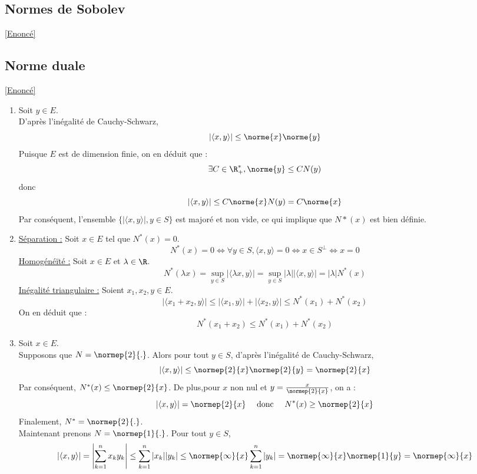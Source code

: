 \documentclass{book}
\begin{document}
	\subsection{Normes de Sobolev}\label{sec:normes-de-sobolev}
		\textcolor{blue}{\hyperref[Normes de Sobolev]{[Enoncé]}}\\
		
	\subsection{Norme duale}\label{sec:norme-duale}
		\textcolor{blue}{\hyperref[Norme duale]{[Enoncé]}}\\
		\begin{enumerate}
			\item Soit $y\in E$.\\
			D'après l'inégalité de Cauchy-Schwarz, \[|\langle x,y\rangle|\leq\norme{x}\norme{y}\]
			Puisque $E$ est de dimension finie, on en déduit que :
			\[\exists C\in\R^*_+,\norme{y}\leq CN(y)\]
			donc \[|\langle x,y\rangle|\leq C\norme{x}N(y)=C\norme{x}\]
			Par conséquent, l'ensemble $\{|\langle x,y\rangle|, y\in S\}$ est majoré et non vide, ce qui implique que $N*(x)$ est bien définie.
			\item \underline{Séparation :} Soit $x\in E$ tel que $N^*(x)=0$.\\
			\[N^*(x)=0\Leftrightarrow \forall y\in S, \langle x,y\rangle=0\Leftrightarrow x\in S^\perp \Leftrightarrow x=0\]
			\underline{Homogénéïté :} Soit $x\in E$ et $\lambda\in\R$.\\
			\[N^*(\lambda x)=\sup\limits_{y\in S}|\langle \lambda x,y\rangle|=\sup\limits_{y\in S}|\lambda||\langle x,y\rangle|=|\lambda|N^*(x)\]
			\underline{Inégalité triangulaire :} Soient $x_1,x_2,y\in E$.
			\[|\langle x_1+x_2,y\rangle |\leq |\langle x_1,y\rangle|+|\langle x_2,y\rangle|\leq N^*(x_1)+N^*(x_2)\]
			On en déduit que :
			\[N^*(x_1+x_2)\leq N^*(x_1)+N^*(x_2)\]
			\item 
			 Soit $x\in E$.\\
			 Supposons que $N=\normep{2}{.}$. Alors pour tout $y\in S$, d'après l'inégalité de Cauchy-Schwarz,
			\[|\langle x,y\rangle|\leq \normep{2}{x}\normep{2}{y}=\normep{2}{x}\]
			Par conséquent, $N^*(x)\leq\normep{2}{x}$. De plus,pour $x$ non nul et $y=\frac{x}{\normep{2}{x}}$, on a :\[|\langle x,y\rangle|=\normep{2}{x} \quad\text{ donc }\quad N^*(x)\geq \normep{2}{x}\]
			Finalement, $N^*=\normep{2}{.}$.\\
			Maintenant prenons $N=\normep{1}{.}$. Pour tout $y\in S$,
			\[|\langle x,y\rangle|=\left|\sum_{k=1}^{n}x_ky_k\right|\leq\sum_{k=1}^{n}|x_k||y_k|\leq \normep{\infty}{x}\sum_{k=1}^{n}|y_k|=\normep{\infty}{x}\normep{1}{y}=\normep{\infty}{x}\]

\end{enumerate}
\end{document}
